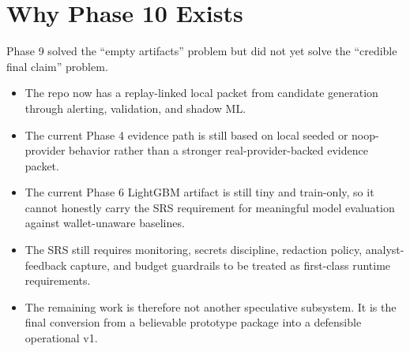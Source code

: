 \documentclass{article}
\begin{document}
\section*{Why Phase 10 Exists}
Phase 9 solved the ``empty artifacts'' problem but did not yet solve the ``credible final claim'' problem.
\begin{itemize}
\item The repo now has a replay-linked local packet from candidate generation through alerting, validation, and shadow ML.
\item The current Phase 4 evidence path is still based on local seeded or noop-provider behavior rather than a stronger real-provider-backed evidence packet.
\item The current Phase 6 LightGBM artifact is still tiny and train-only, so it cannot honestly carry the SRS requirement for meaningful model evaluation against wallet-unaware baselines.
\item The SRS still requires monitoring, secrets discipline, redaction policy, analyst-feedback capture, and budget guardrails to be treated as first-class runtime requirements.
\item The remaining work is therefore not another speculative subsystem. It is the final conversion from a believable prototype package into a defensible operational v1.
\end{itemize}
\end{document}

